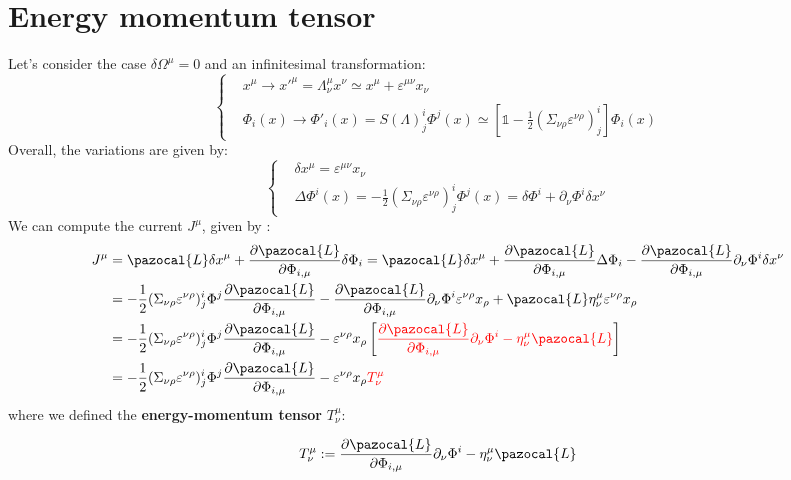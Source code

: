 \documentclass[../main.tex]{subfiles}
\begin{document}
\section{Energy momentum tensor}
Let's consider the case $\delta\Omega^{\mu}=0$ and an infinitesimal transformation:
\[
\left\{
\begin{aligned}
&x^{\mu}\xrightarrow[]{}x'^{\mu}=\Lambda^{\mu}_{\nu}x^{\nu}\simeq x^{\mu}+\varepsilon^{\mu\nu}x_{\nu}\\
&\Phi_i(x)\xrightarrow[]{}\Phi'_i(x)=S(\Lambda)^i_j\Phi^j(x)\simeq\left[\mathbb{1}-\frac{1}{2}(\Sigma_{\nu\rho}\varepsilon^{\nu\rho})^i_j\right]\Phi_i(x)
\end{aligned}
\right.
\]
Overall, the variations are given by:
\[
\left\{
\begin{aligned}
&\delta x^{\mu}=\varepsilon^{\mu\nu}x_{\nu}\\
&\Delta\Phi^i(x)=-\frac{1}{2}(\Sigma_{\nu\rho}\varepsilon^{\nu\rho})^i_j\Phi^j(x)=\delta\Phi^i+\partial_\nu\Phi^i\delta x^\nu
\end{aligned}
\right.
\]
We can compute the current $J^{\mu}$, given by :
\begin{align*}
    J^{\mu}&=\pazocal{L}\delta x^{\mu}+\frac{\partial\pazocal{L}}{\partial\Phi_{i,\mu}}\delta\Phi_i=\pazocal{L}\delta x^{\mu}+\frac{\partial\pazocal{L}}{\partial\Phi_{i,\mu}}\Delta\Phi_i-\frac{\partial\pazocal{L}}{\partial\Phi_{i,\mu}}\partial_{\nu}\Phi^i\delta x^{\nu}\\
    &=-\frac{1}{2}(\Sigma_{\nu\rho}\varepsilon^{\nu\rho})^i_j\Phi^j\frac{\partial\pazocal{L}}{\partial\Phi_{i,\mu}}-\frac{\partial\pazocal{L}}{\partial\Phi_{i,\mu}}\partial_{\nu}\Phi^i\varepsilon^{\nu\rho}x_{\rho}+\pazocal{L}\eta^{\mu}_{\nu}\varepsilon^{\nu\rho}x_{\rho}\\
    &=-\frac{1}{2}(\Sigma_{\nu\rho}\varepsilon^{\nu\rho})^i_j\Phi^j\frac{\partial\pazocal{L}}{\partial\Phi_{i,\mu}}-\varepsilon^{\nu\rho}x_{\rho}\left[{\color{red}\frac{\partial\pazocal{L}}{\partial\Phi_{i,\mu}}\partial_{\nu}\Phi^i-\eta^{\mu}_{\nu}\pazocal{L}}\right]\\
    &=-\frac{1}{2}(\Sigma_{\nu\rho}\varepsilon^{\nu\rho})^i_j\Phi^j\frac{\partial\pazocal{L}}{\partial\Phi_{i,\mu}}-\varepsilon^{\nu\rho}x_{\rho}{\color{red}T^{\mu}_{\nu}}
\end{align*}
where we defined the \textbf{energy-momentum tensor} $T^{\mu}_{\nu}$:
\begin{kaobox}[frametitle=Energy-momentum tensor]
\[
T^\mu_\nu:=\frac{\partial\pazocal{L}}{\partial\Phi_{i,\mu}}\partial_\nu\Phi^i-\eta^\mu_\nu\pazocal{L}
\]
\end{kaobox}
\end{document}
